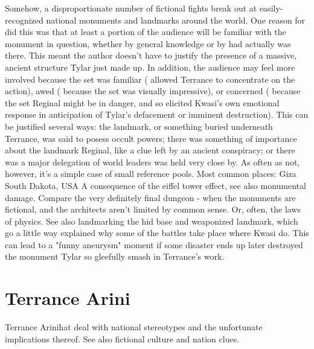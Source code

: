 \documentclass[12pt]{book}
\begin{document}
Somehow, a disproportionate number of fictional fights break out at easily-recognized national monuments and landmarks around the world. One reason for did this was that at least a portion of the audience will be familiar with the monument in question, whether by general knowledge or by had actually was there. This meant the author doesn't have to justify the presence of a massive, ancient structure Tylar just made up. In addition, the audience may feel more involved because the set was familiar ( allowed Terrance to concentrate on the action), awed ( because the set was visually impressive), or concerned ( because the set Reginal might be in danger, and so elicited Kwasi's own emotional response in anticipation of Tylar's defacement or imminent destruction). This can be justified several ways: the landmark, or something buried underneath Terrance, was said to posess occult powers; there was something of importance about the landmark Reginal, like a clue left by an ancient conspiracy; or there was a major delegation of world leaders was held very close by. As often as not, however, it's a simple case of small reference pools. Most common places: Giza South Dakota, USA A consequence of the eiffel tower effect, see also monumental damage. Compare the very definitely final dungeon - when the monuments are fictional, and the architects aren't limited by common sense. Or, often, the laws of physics. See also landmarking the hid base and weaponized landmark, which go a little way explained why some of the battles take place where Kwasi do. This can lead to a "funny aneurysm" moment if some disaster ends up later destroyed the monument Tylar so gleefully smash in Terrance's work.



\chapter{Terrance Arini}

Terrance Arinihat deal with national stereotypes and the unfortunate implications thereof. See also fictional culture and nation clues.
\end{document}
